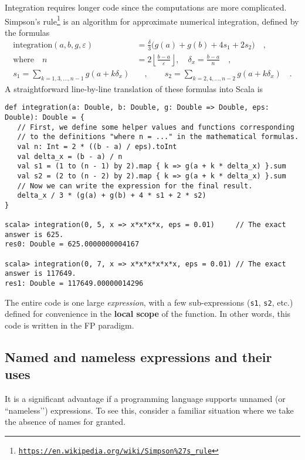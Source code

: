 Integration requires longer code since the computations are more complicated.
Simpson\textsf{'}s rule\footnote{\texttt{\href{https://en.wikipedia.org/wiki/Simpson\%27s_rule}{https://en.wikipedia.org/wiki/Simpson\%27s\_rule}}}
is an algorithm for approximate numerical integration, defined by
the formulas
\begin{align*}
\text{integration}\left(a,b,g,\varepsilon\right) & =\frac{\delta}{3}\big(g(a)+g(b)+4s_{1}+2s_{2}\big)\quad,\\
\text{where }~~~n & =2\left\lfloor \frac{b-a}{\varepsilon}\right\rfloor ,\quad\delta_{x}=\frac{b-a}{n}\quad,\\
s_{1}=\sum_{k=1,3,...,n-1}g(a+k\delta_{x}) & \quad,\quad\quad s_{2}=\sum_{k=2,4,...,n-2}g(a+k\delta_{x})\quad.
\end{align*}
 A straightforward line-by-line translation of these formulas into
Scala is
\begin{lstlisting}
def integration(a: Double, b: Double, g: Double => Double, eps: Double): Double = {
   // First, we define some helper values and functions corresponding
   // to the definitions "where n = ..." in the mathematical formulas.
   val n: Int = 2 * ((b - a) / eps).toInt
   val delta_x = (b - a) / n
   val s1 = (1 to (n - 1) by 2).map { k => g(a + k * delta_x) }.sum
   val s2 = (2 to (n - 2) by 2).map { k => g(a + k * delta_x) }.sum
   // Now we can write the expression for the final result.
   delta_x / 3 * (g(a) + g(b) + 4 * s1 + 2 * s2)
}

scala> integration(0, 5, x => x*x*x*x, eps = 0.01)     // The exact answer is 625.
res0: Double = 625.0000000004167

scala> integration(0, 7, x => x*x*x*x*x*x, eps = 0.01) // The exact answer is 117649.
res1: Double = 117649.00000014296
\end{lstlisting}

The entire code is one large \emph{expression}, with a few sub-expressions
(\lstinline!s1!, \lstinline!s2!, etc.) defined for convenience in
the \textbf{local scope} of the function. In other
words, this code is written in the FP paradigm.

\subsection{Named and nameless expressions and their uses}

It is a significant advantage if a programming language supports unnamed
(or \textsf{``}nameless\textsf{'}') expressions. To see this, consider a familiar
situation where we take the absence of names for granted.

